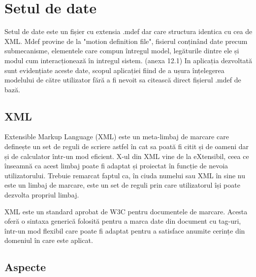 \newpage
\section{Setul de date}

Setul de date este un fișier cu extensia .mdef dar care structura identica cu cea de XML. Mdef provine de la "motion definition file", fisierul conținând
date precum submecanisme, elementele care compun întregul model, legăturile dintre ele și modul cum interacționează în intregul sistem. (anexa 12.1) In aplicația dezvoltată sunt evidențiate
aceste date, scopul aplicației fiind de a ușura înțelegerea modelului de către utilizator fără a fi nevoit sa citească direct fișierul .mdef de bază.

\subsection{XML}
Extensible Markup Language (XML) este un meta-limbaj de marcare care definește un set de reguli de scriere astfel în cat sa poată fi citit și de oameni dar și de calculator într-un mod eficient. X-ul din XML vine de la eXtensibil, ceea ce înseamnă ca acest limbaj poate fi adaptat și proiectat în funcție de nevoia utilizatorului. Trebuie remarcat faptul ca, în ciuda numelui sau XML în sine nu este un limbaj de marcare, este un set de reguli prin care utilizatorul își poate dezvolta propriul limbaj.

XML este un standard aprobat de W3C pentru documentele de marcare. Acesta oferă o
sintaxa generică folosită pentru a marca date din document cu tag-uri, într-un mod flexibil care poate fi adaptat pentru a satisface anumite cerințe din domeniul în care este aplicat.

\subsection{Aspecte}

